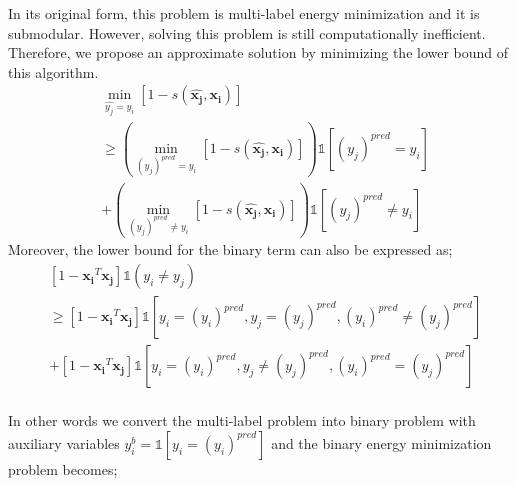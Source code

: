 In its original form, this problem is multi-label energy minimization and it is submodular. However, solving this problem is still computationally inefficient. Therefore, we propose an approximate solution by minimizing the lower bound of this algorithm.
 \begin{equation}
 \begin{aligned}
 &\min_{\hat{y_j}=y_i} [1 - s(\mathbf{\hat{x_j}},\mathbf{x_{i}})] \\
  &\geq \left(\min_{ (y_j)^{pred} = y_i} [1 - s(\mathbf{\hat{x_j}},\mathbf{x_{i}})] \right) \mathds{1}[(y_j)^{pred} = y_i] \\ &+ \left(\min_{ (y_j)^{pred} \neq y_i} [1 - s(\mathbf{\hat{x_j}},\mathbf{x_{i}})] \right) \mathds{1}[(y_j)^{pred} \neq y_i]  
 \end{aligned}
 \end{equation}
 Moreover, the lower bound for the binary term can also be expressed as;
 {\small
 \begin{equation}
 \begin{aligned}
 &[1 - \mathbf{x_i}^T \mathbf{x_j}] \mathds{1}(y_i \neq y_j)   \\
 &\geq [1 - \mathbf{x_i}^T \mathbf{x_j}] \mathds{1}[y_i=(y_i)^{pred}, y_j=(y_j)^{pred}, (y_i)^{pred} \neq (y_j)^{pred}] \\
 &+  [1 - \mathbf{x_i}^T \mathbf{x_j}] \mathds{1}[y_i=(y_i)^{pred}, y_j \neq (y_j)^{pred}, (y_i)^{pred} = (y_j)^{pred}] \\
 \end{aligned}
 \end{equation}}
 
 In other words we convert the multi-label problem into binary problem with auxiliary variables \mbox{$y^b_i = \mathds{1}[y_i = (y_i)^{pred}]$} and the binary energy minimization problem becomes;
 
